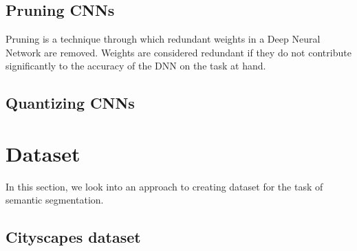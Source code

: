 \subsection{Pruning CNNs}

Pruning is a technique through which redundant weights in a Deep Neural Network are removed. Weights are considered redundant if they do not contribute significantly to the accuracy of the DNN on the task at hand. 

\cite{DBLP:journals/corr/MolchanovTKAK16}

\subsection{Quantizing CNNs}

\cite{DBLP:journals/corr/WuLWHC15}




\section{Dataset}
\label{section:dataset}

In this section, we look into an approach to creating dataset for the task of semantic segmentation.

\subsection{Cityscapes dataset}


